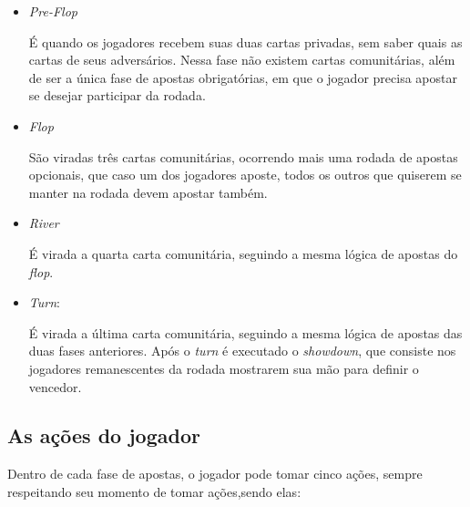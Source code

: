 \begin{itemize}
      \item \textit{Pre-Flop}

            É quando os jogadores recebem suas duas cartas privadas, sem saber quais as cartas de seus adversários. Nessa fase não existem cartas comunitárias, além de ser a única fase de apostas obrigatórias, em que o jogador precisa apostar se desejar participar da rodada.

      \item \textit{Flop}

            São viradas três cartas comunitárias, ocorrendo mais uma rodada de apostas opcionais, que caso um dos jogadores aposte, todos os outros que quiserem se manter na rodada devem apostar também.

      \item \textit{River}

            É virada a quarta carta comunitária, seguindo a mesma lógica de apostas do \textit{flop}.

      \item \textit{Turn}:

            É virada a última carta comunitária, seguindo a mesma lógica de apostas das duas fases anteriores. Após o \textit{turn} é executado o \textit{showdown}, que consiste nos jogadores remanescentes da rodada mostrarem sua mão para definir o vencedor.
\end{itemize}

\subsection{As ações do jogador}

Dentro de cada fase de apostas, o jogador pode tomar cinco ações, sempre respeitando seu momento de tomar ações,sendo elas:

